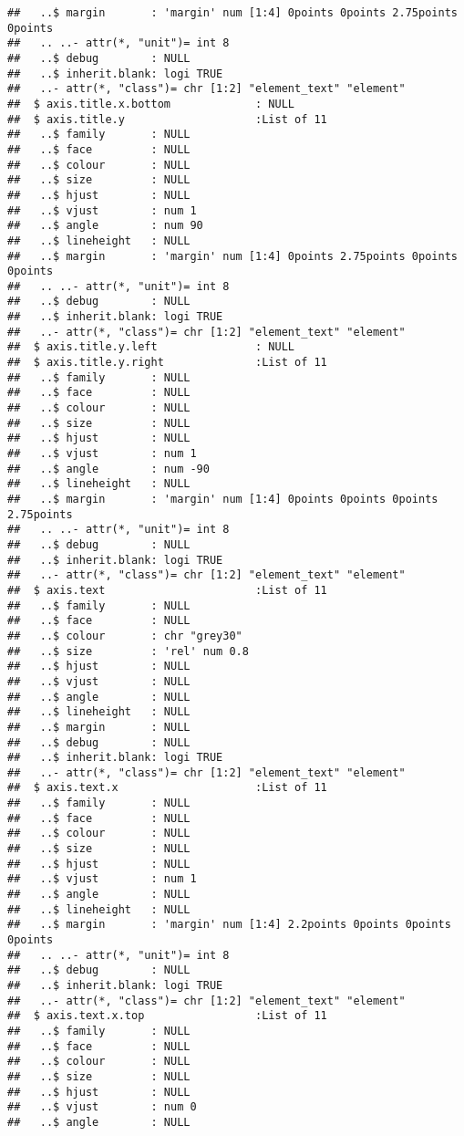 \documentclass[
]{article}
\begin{document}
\begin{verbatim}
##   ..$ margin       : 'margin' num [1:4] 0points 0points 2.75points 0points
##   .. ..- attr(*, "unit")= int 8
##   ..$ debug        : NULL
##   ..$ inherit.blank: logi TRUE
##   ..- attr(*, "class")= chr [1:2] "element_text" "element"
##  $ axis.title.x.bottom             : NULL
##  $ axis.title.y                    :List of 11
##   ..$ family       : NULL
##   ..$ face         : NULL
##   ..$ colour       : NULL
##   ..$ size         : NULL
##   ..$ hjust        : NULL
##   ..$ vjust        : num 1
##   ..$ angle        : num 90
##   ..$ lineheight   : NULL
##   ..$ margin       : 'margin' num [1:4] 0points 2.75points 0points 0points
##   .. ..- attr(*, "unit")= int 8
##   ..$ debug        : NULL
##   ..$ inherit.blank: logi TRUE
##   ..- attr(*, "class")= chr [1:2] "element_text" "element"
##  $ axis.title.y.left               : NULL
##  $ axis.title.y.right              :List of 11
##   ..$ family       : NULL
##   ..$ face         : NULL
##   ..$ colour       : NULL
##   ..$ size         : NULL
##   ..$ hjust        : NULL
##   ..$ vjust        : num 1
##   ..$ angle        : num -90
##   ..$ lineheight   : NULL
##   ..$ margin       : 'margin' num [1:4] 0points 0points 0points 2.75points
##   .. ..- attr(*, "unit")= int 8
##   ..$ debug        : NULL
##   ..$ inherit.blank: logi TRUE
##   ..- attr(*, "class")= chr [1:2] "element_text" "element"
##  $ axis.text                       :List of 11
##   ..$ family       : NULL
##   ..$ face         : NULL
##   ..$ colour       : chr "grey30"
##   ..$ size         : 'rel' num 0.8
##   ..$ hjust        : NULL
##   ..$ vjust        : NULL
##   ..$ angle        : NULL
##   ..$ lineheight   : NULL
##   ..$ margin       : NULL
##   ..$ debug        : NULL
##   ..$ inherit.blank: logi TRUE
##   ..- attr(*, "class")= chr [1:2] "element_text" "element"
##  $ axis.text.x                     :List of 11
##   ..$ family       : NULL
##   ..$ face         : NULL
##   ..$ colour       : NULL
##   ..$ size         : NULL
##   ..$ hjust        : NULL
##   ..$ vjust        : num 1
##   ..$ angle        : NULL
##   ..$ lineheight   : NULL
##   ..$ margin       : 'margin' num [1:4] 2.2points 0points 0points 0points
##   .. ..- attr(*, "unit")= int 8
##   ..$ debug        : NULL
##   ..$ inherit.blank: logi TRUE
##   ..- attr(*, "class")= chr [1:2] "element_text" "element"
##  $ axis.text.x.top                 :List of 11
##   ..$ family       : NULL
##   ..$ face         : NULL
##   ..$ colour       : NULL
##   ..$ size         : NULL
##   ..$ hjust        : NULL
##   ..$ vjust        : num 0
##   ..$ angle        : NULL

\end{verbatim}
\end{document}
